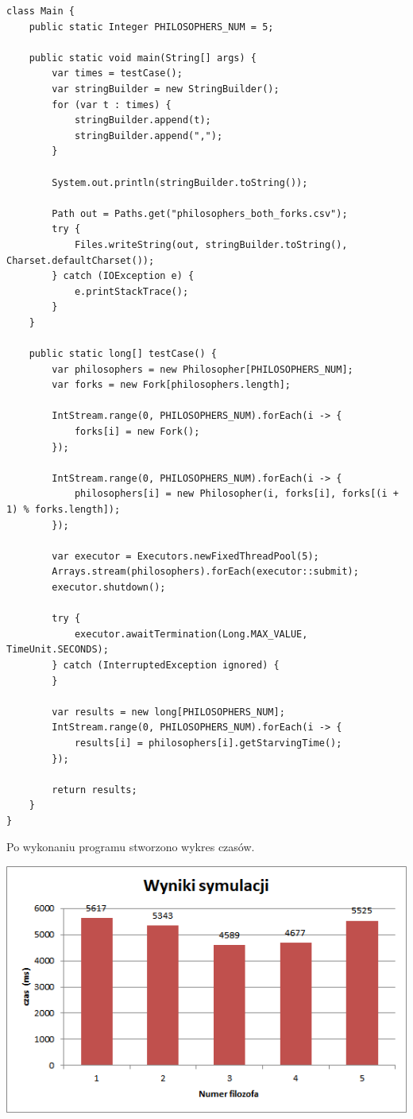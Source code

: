 \documentclass[12pt]{article}
\begin{document}
\begin{verbatim}
class Main {
    public static Integer PHILOSOPHERS_NUM = 5;

    public static void main(String[] args) {
        var times = testCase();
        var stringBuilder = new StringBuilder();
        for (var t : times) {
            stringBuilder.append(t);
            stringBuilder.append(",");
        }

        System.out.println(stringBuilder.toString());

        Path out = Paths.get("philosophers_both_forks.csv");
        try {
            Files.writeString(out, stringBuilder.toString(), Charset.defaultCharset());
        } catch (IOException e) {
            e.printStackTrace();
        }
    }

    public static long[] testCase() {
        var philosophers = new Philosopher[PHILOSOPHERS_NUM];
        var forks = new Fork[philosophers.length];

        IntStream.range(0, PHILOSOPHERS_NUM).forEach(i -> {
            forks[i] = new Fork();
        });

        IntStream.range(0, PHILOSOPHERS_NUM).forEach(i -> {
            philosophers[i] = new Philosopher(i, forks[i], forks[(i + 1) % forks.length]);
        });

        var executor = Executors.newFixedThreadPool(5);
        Arrays.stream(philosophers).forEach(executor::submit);
        executor.shutdown();

        try {
            executor.awaitTermination(Long.MAX_VALUE, TimeUnit.SECONDS);
        } catch (InterruptedException ignored) {
        }

        var results = new long[PHILOSOPHERS_NUM];
        IntStream.range(0, PHILOSOPHERS_NUM).forEach(i -> {
            results[i] = philosophers[i].getStarvingTime();
        });

        return results;
    }
}
\end{verbatim}


\noindent
Po wykonaniu programu stworzono wykres czasów.
\begin{center}
\centering
    \includegraphics{philosophers_both_forks.png}
\end{center}
\end{document}
